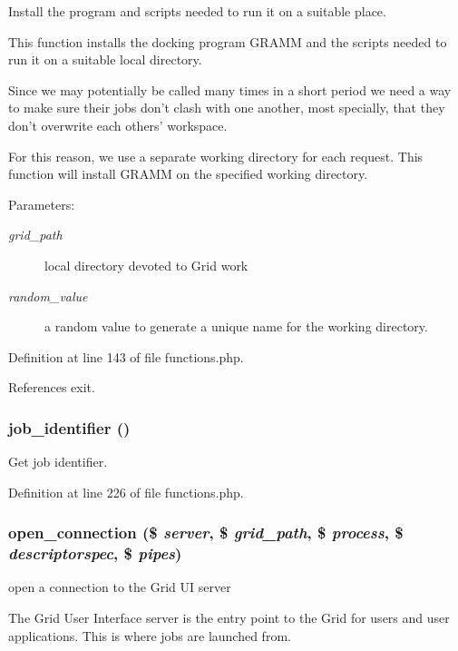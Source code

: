 Install the program and scripts needed to run it on a suitable place. 

This function installs the docking program GRAMM and the scripts needed to run it on a suitable local directory.

Since we may potentially be called many times in a short period we need a way to make sure their jobs don't clash with one another, most specially, that they don't overwrite each others' workspace.

For this reason, we use a separate working directory for each request. This function will install GRAMM on the specified working directory.

\begin{Desc}
\item[Parameters:]
\begin{description}
\item[{\em grid\_\-path}]local directory devoted to Grid work \item[{\em random\_\-value}]a random value to generate a unique name for the working directory. \end{description}
\end{Desc}


Definition at line 143 of file functions.php.

References exit.
\subsubsection{\setlength{\rightskip}{0pt plus 5cm}job\_\-identifier ()}\label{functions_8php_a5}


Get job identifier. 



Definition at line 226 of file functions.php.
\subsubsection{\setlength{\rightskip}{0pt plus 5cm}open\_\-connection (\$ {\em server}, \$ {\em grid\_\-path}, \$ {\em process}, \$ {\em descriptorspec}, \$ {\em pipes})}\label{functions_8php_a0}


open a connection to the Grid UI server 

The Grid User Interface server is the entry point to the Grid for users and user applications. This is where jobs are launched from.

